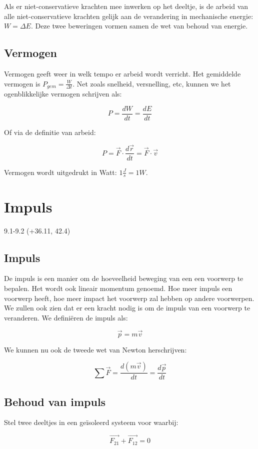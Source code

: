 \documentclass[12pt,a4paper]{article}
\begin{document}
    Als er niet-conservatieve krachten mee inwerken op het deeltje, 
    is de arbeid van alle niet-conservatieve krachten gelijk aan de verandering
    in mechanische energie: $W = \Delta E$. Deze twee beweringen vormen
    samen de wet van behoud van energie.
    
    \subsection{Vermogen}
    Vermogen geeft weer in welk tempo er arbeid wordt verricht. Het gemiddelde vermogen is
    $P_{gem} = \frac{W}{\Delta t}$. Net zoals snelheid, versnelling, etc, kunnen we het ogenblikkelijke vermogen
    schrijven als:
    
    $$P = \frac{dW}{dt} = \frac{dE}{dt}$$
    
    Of via de definitie van arbeid:
    
    $$P = \vec{F} \cdot \frac{d\vec{r}}{dt} = \vec{F} \cdot \vec{v}$$ 
    
     Vermogen wordt uitgedrukt in Watt: $1 \frac{J}{s} = 1 W$.

    \section{Impuls}
    9.1-9.2 (+36.11, 42.4)

    \subsection{Impuls}
    De impuls is een manier om de hoeveelheid beweging van een een voorwerp te
    bepalen. Het wordt ook lineair momentum genoemd. Hoe meer impuls een voorwerp
    heeft, hoe meer impact het voorwerp zal hebben op andere voorwerpen. We zullen
    ook zien dat er een kracht nodig is om de impuls van een voorwerp te veranderen. We
    definiëren de impuls als:
    
    $$\vec{p} = m\vec{v}$$
    
    We kunnen nu ook de tweede wet van Newton herschrijven:
    
    $$\sum \vec{F} = \frac{d(m\vec{v})}{dt} = \frac{d\vec{p}}{dt}$$

    \subsection{Behoud van impuls}
    Stel twee deeltjes in een geïsoleerd systeem voor waarbij:
    
    $$\vec{F_{21}} + \vec{F_{12}} = 0$$
    
\end{document}
